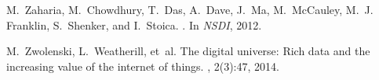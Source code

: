 M.~Zaharia, M.~Chowdhury, T.~Das, A.~Dave, J.~Ma, M.~McCauley, M.~J. Franklin,
  S.~Shenker, and I.~Stoica.
.
\newblock In {\em NSDI}, 2012.

M.~Zwolenski, L.~Weatherill, et~al.
\newblock The digital universe: Rich data and the increasing value of the
  internet of things.
, 2(3):47, 2014.
